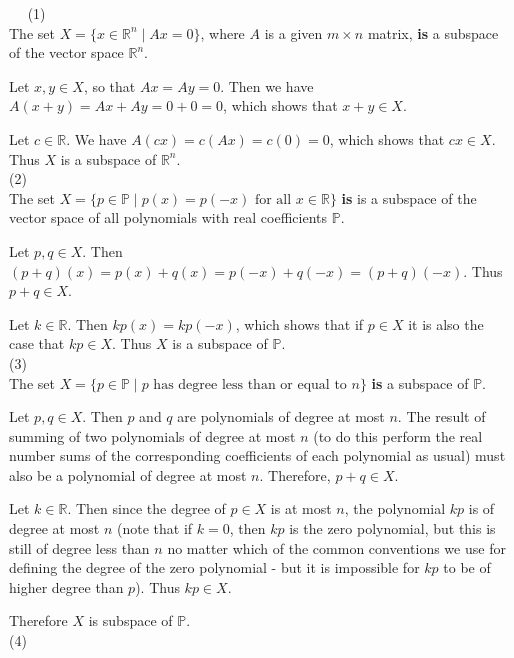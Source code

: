 \documentclass[11pt]{article}
\begin{document}
$\quad$ (1)\\

The set $X = \{x \in \mathbb{R}^n \; | \; Ax = 0\}$, where $A$ is a given $m\times n$ matrix, \textbf{is} a subspace of the vector space $\mathbb{R}^n$.

Let $x,y \in X$, so that $Ax = Ay = 0$. Then we have $A(x+y) = Ax +Ay = 0 + 0 = 0$, which shows that $x+y \in X$.

Let $c \in \mathbb{R}$. We have $A(cx) = c(Ax) = c(0) = 0$, which shows that $cx \in X$. 
Thus $X$ is a subspace of $\mathbb{R}^n$. \\

(2)\\

The set $X = \{p \in \mathbb{P} \; | \; p(x) = p(-x) \text{ for all } x\in \mathbb{R} \}$ \textbf{is} is a subspace of the vector space of all polynomials with real coefficients $\mathbb{P}$.

Let $p,q \in X$. Then $(p+q)(x) = p(x) + q(x) = p(-x) + q(-x) = (p+q)(-x)$. Thus $p+q \in X$. 

Let $k \in \mathbb{R}$. Then $kp(x) = kp(-x)$, which shows that if $p \in X$ it is also the case that $kp \in X$. Thus $X$ is a subspace of $\mathbb{P}$.\\

(3)\\

The set $X = \{p \in \mathbb{P} \; | \; p \text{ has degree less than or equal to } n\}$ \textbf{is} a subspace of $\mathbb{P}$.

Let $p,q \in X$. Then $p$ and $q$ are polynomials of degree at most $n$. The result of summing of two polynomials of degree at most $n$ (to do this perform the real number sums of the corresponding coefficients of each polynomial as usual) must also be a polynomial of degree at most $n$. Therefore, $p+q \in X$.

Let $k \in \mathbb{R}$. Then since the degree of $p \in X$ is at most $n$, the polynomial $kp$ is of degree at most $n$ (note that if $k=0$, then $kp$ is the zero polynomial, but this is still of degree less than $n$ no matter which of the common conventions we use for defining the degree of the zero polynomial - but it is impossible for $kp$ to be of higher degree than $p$). Thus $kp \in X$.

Therefore $X$ is subspace of $\mathbb{P}$. \\

(4)\\
\end{document}
